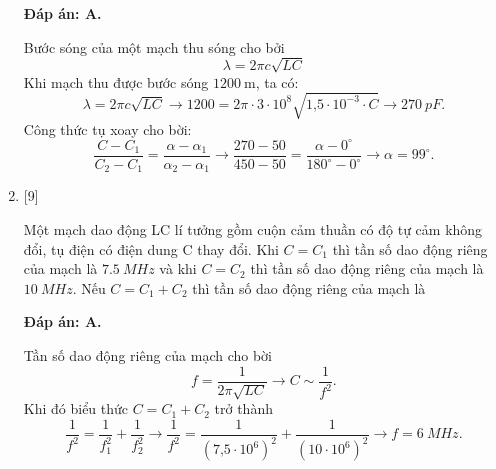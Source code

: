 \begin{enumerate}[label=\bfseries Câu \arabic*:]
	\hideall
	{		\textbf{Đáp án: A.}
		
		Bước sóng của một mạch thu sóng cho bởi
		$$
		\lambda=2 \pi c \sqrt{L C}
		$$
		Khi mạch thu được bước sóng $1200 \mathrm{~m}$, ta có:
		$$
		\lambda=2 \pi c \sqrt{L C} \rightarrow 1200=2 \pi \cdot 3\cdot10^{8} \sqrt{\text{1,5}\cdot10^{-3} \cdot C} \rightarrow \SI{270}{pF}.
		$$
		Công thức tụ xoay cho bời:
		$$
		\dfrac{C-C_{1}}{C_{2}-C_{1}}=\dfrac{\alpha-\alpha_{1}}{\alpha_{2}-\alpha_{1}} \rightarrow \dfrac{270-50}{450-50}=\dfrac{\alpha-0^{\circ}}{180^{\circ}-0^{\circ}} \rightarrow \alpha=99^{\circ}.
		$$
		
	}
	
	
	\item {} [9] 
	
	{Một mạch dao động LC lí tưởng gồm cuộn cảm thuần có độ tự cảm không đổi, tụ điện có điện dung C thay đổi. Khi $C = C_1$ thì tần số dao động riêng của mạch là $\SI{7,5}{MHz}$ và khi $C = C_2$ thì tần số dao động riêng của mạch là $\SI{10}{MHz}$. Nếu $C = C_1 + C_2$ thì tần số dao động riêng của mạch là
	}
	
	\hideall
	{		\textbf{Đáp án: A.}
		
		Tần số dao động riêng của mạch cho bời
		$$
		f=\dfrac{1}{2 \pi \sqrt{L C}} \rightarrow C \sim \dfrac{1}{f^{2}}.
		$$
		Khi đó biểu thức $C=C_{1}+C_{2}$ trở thành
		$$
		\dfrac{1}{f^{2}}=\dfrac{1}{f_{1}^{2}}+\dfrac{1}{f_{2}^{2}} \rightarrow \dfrac{1}{f^{2}}=\dfrac{1}{\left(\text{7,5}\cdot10^{6}\right)^{2}}+\dfrac{1}{\left(10\cdot10^{6}\right)^{2}} \rightarrow f = \SI{6}{MHz}.
		$$
		
	}
	
\end{enumerate}
